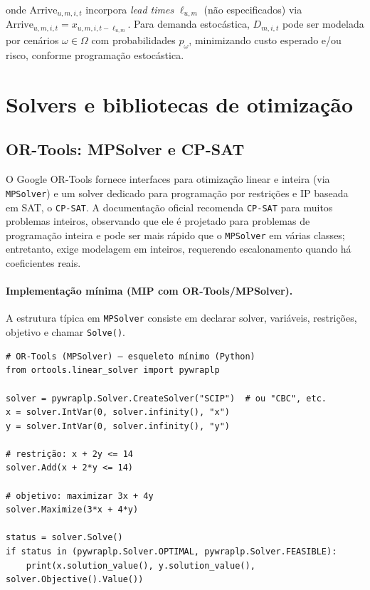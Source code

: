 onde \(\text{Arrive}_{u,m,i,t}\) incorpora \emph{lead times} \(\ell_{u,m}\) (não especificados) via \(\text{Arrive}_{u,m,i,t}=x_{u,m,i,t-\ell_{u,m}}\). \cite{Axsater2006InventoryControl} Para demanda estocástica, \(D_{m,i,t}\) pode ser modelada por cenários \(\omega\in\Omega\) com probabilidades \(p_\omega\), minimizando custo esperado e/ou risco, conforme programação estocástica. \cite{BirgeLouveaux2011StochasticProgramming}

\section{Solvers e bibliotecas de otimização}

\subsection{OR-Tools: MPSolver e CP-SAT}

O Google OR-Tools fornece interfaces para otimização linear e inteira (via \texttt{MPSolver}) e um solver dedicado para programação por restrições e IP baseada em SAT, o \texttt{CP-SAT}. \cite{ORToolsMIPExample,ORToolsCPSATSolver} A documentação oficial recomenda \texttt{CP-SAT} para muitos problemas inteiros, observando que ele é projetado para problemas de programação inteira e pode ser mais rápido que o \texttt{MPSolver} em várias classes; entretanto, exige modelagem em inteiros, requerendo escalonamento quando há coeficientes reais. \cite{ORToolsCPSATSolver}

\paragraph{Implementação mínima (MIP com OR-Tools/MPSolver).}
A estrutura típica em \texttt{MPSolver} consiste em declarar solver, variáveis, restrições, objetivo e chamar \texttt{Solve()}. \cite{ORToolsMIPExample}

\begin{verbatim}
# OR-Tools (MPSolver) – esqueleto mínimo (Python)
from ortools.linear_solver import pywraplp

solver = pywraplp.Solver.CreateSolver("SCIP")  # ou "CBC", etc.
x = solver.IntVar(0, solver.infinity(), "x")
y = solver.IntVar(0, solver.infinity(), "y")

# restrição: x + 2y <= 14
solver.Add(x + 2*y <= 14)

# objetivo: maximizar 3x + 4y
solver.Maximize(3*x + 4*y)

status = solver.Solve()
if status in (pywraplp.Solver.OPTIMAL, pywraplp.Solver.FEASIBLE):
    print(x.solution_value(), y.solution_value(), solver.Objective().Value())
\end{verbatim}

